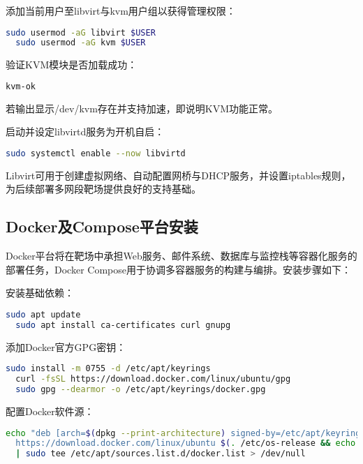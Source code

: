 \documentclass[lang=cn,10pt]{elegantbook}
\begin{document}
添加当前用户至libvirt与kvm用户组以获得管理权限：

\begin{lstlisting}[language=bash]
  sudo usermod -aG libvirt $USER
  sudo usermod -aG kvm $USER
\end{lstlisting}

验证KVM模块是否加载成功：

\begin{lstlisting}[language=bash]
  kvm-ok
\end{lstlisting}

若输出显示/dev/kvm存在并支持加速，即说明KVM功能正常。

启动并设定libvirtd服务为开机自启：

\begin{lstlisting}[language=bash]
  sudo systemctl enable --now libvirtd
\end{lstlisting}

Libvirt可用于创建虚拟网络、自动配置网桥与DHCP服务，并设置iptables规则，为后续部署多网段靶场提供良好的支持基础。

\subsection{Docker及Compose平台安装}

Docker平台将在靶场中承担Web服务、邮件系统、数据库与监控栈等容器化服务的部署任务，Docker Compose用于协调多容器服务的构建与编排。安装步骤如下：

安装基础依赖：

\begin{lstlisting}[language=bash]
  sudo apt update
  sudo apt install ca-certificates curl gnupg
\end{lstlisting}

添加Docker官方GPG密钥：

\begin{lstlisting}[language=bash]
  sudo install -m 0755 -d /etc/apt/keyrings
  curl -fsSL https://download.docker.com/linux/ubuntu/gpg
  sudo gpg --dearmor -o /etc/apt/keyrings/docker.gpg
\end{lstlisting}

配置Docker软件源：

\begin{lstlisting}[language=bash]
  echo "deb [arch=$(dpkg --print-architecture) signed-by=/etc/apt/keyrings/docker.gpg]
  https://download.docker.com/linux/ubuntu $(. /etc/os-release && echo "$VERSION_CODENAME") stable"
  | sudo tee /etc/apt/sources.list.d/docker.list > /dev/null
\end{lstlisting}
\end{document}
